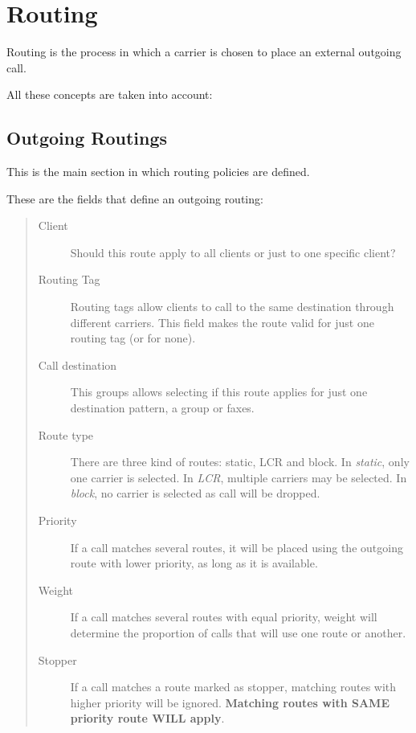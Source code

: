 \documentclass[letterpaper,10pt,english]{sphinxmanual}
\begin{document}
\section{Routing}
\label{administration_portal/brand/routing/index::doc}\label{administration_portal/brand/routing/index:routing}
Routing is the process in which a carrier is chosen to place an external outgoing call.

All these concepts are taken into account:
\label{administration_portal/brand/routing/outgoing_routings:routes-weights}

\subsection{Outgoing Routings}
\label{administration_portal/brand/routing/outgoing_routings:routes-weights}\label{administration_portal/brand/routing/outgoing_routings:id1}\label{administration_portal/brand/routing/outgoing_routings::doc}\label{administration_portal/brand/routing/outgoing_routings:outgoing-routings}
This is the main section in which routing policies are defined.

These are the fields that define an outgoing routing:
\begin{quote}
\begin{description}
\item[{Client}] \leavevmode
Should this route apply to all clients or just to one specific client?

\item[{Routing Tag}] \leavevmode
Routing tags allow clients to call to the same destination through different carriers. This field makes the
route valid for just one routing tag (or for none).

\item[{Call destination}] \leavevmode
This groups allows selecting if this route applies for just one destination pattern, a group or faxes.

\item[{Route type}] \leavevmode
There are three kind of routes: static, LCR and block. In \emph{static}, only one carrier is selected. In \emph{LCR}, multiple carriers
may be selected. In \emph{block}, no carrier is selected as call will be dropped.

\item[{Priority}] \leavevmode
If a call matches several routes, it will be placed using the outgoing
route with lower priority, as long as it is available.

\item[{Weight}] \leavevmode
If a call matches several routes with equal priority, weight will determine
the proportion of calls that will use one route or another.

\item[{Stopper}] \leavevmode
If a call matches a route marked as stopper, matching routes with higher priority
will be ignored. \textbf{Matching routes with SAME priority route WILL apply}.

\end{description}
\end{quote}
\end{document}
